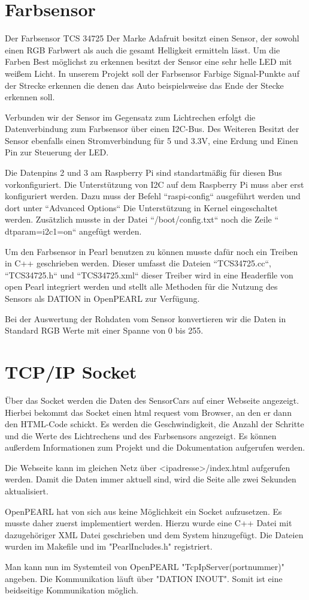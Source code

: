 \section{Farbsensor}
Der Farbsensor TCS 34725 Der Marke Adafruit besitzt einen Sensor, der sowohl einen RGB Farbwert als auch die gesamt Helligkeit ermitteln lässt. Um die Farben Best möglichst zu erkennen besitzt der Sensor eine sehr helle LED mit weißem Licht. In unserem Projekt soll der Farbsensor Farbige Signal-Punkte auf der Strecke erkennen die denen das Auto beispielsweise das Ende der Stecke erkennen soll. 

Verbunden wir der Sensor im Gegensatz zum Lichtrechen erfolgt die Datenverbindung zum Farbsensor über einen I2C-Bus. Des Weiteren Besitzt der Sensor ebenfalls einen Stromverbindung für 5 und 3.3V, eine Erdung und Einen Pin zur Steuerung der LED.

Die Datenpins 2 und 3 am Raspberry Pi sind standartmäßig für diesen Bus vorkonfiguriert. Die Unterstützung von I2C auf dem Raspberry Pi muss aber erst konfiguriert werden. Dazu muss der Befehl “raspi-config“ ausgeführt werden und dort unter “Advanced Options“ Die Unterstützung in Kernel eingeschaltet werden. Zusätzlich musste in der Datei “/boot/config.txt“ noch die Zeile “ dtparam=i2c1=on“ angefügt werden.

Um den Farbsensor in Pearl benutzen zu können musste dafür noch ein Treiben in C++ geschrieben werden. Dieser umfasst die Dateien “TCS34725.cc“, “TCS34725.h“ und “TCS34725.xml“ dieser Treiber wird in eine Headerfile von open Pearl integriert werden und stellt alle Methoden für die Nutzung des Sensors als DATION in OpenPEARL zur Verfügung.

Bei der Auswertung der Rohdaten vom Sensor konvertieren wir die Daten in Standard RGB Werte mit einer Spanne von 0 bis 255.

\section{TCP/IP Socket}
Über das Socket werden die Daten des SensorCars auf einer Webseite angezeigt. Hierbei bekommt das Socket einen html request vom Browser, an den er dann den HTML-Code schickt. Es werden die Geschwindigkeit, die Anzahl der Schritte und die Werte des Lichtrechens und des Farbsensors angezeigt. Es können außerdem Informationen zum Projekt und die Dokumentation aufgerufen werden. 

Die Webseite kann im gleichen Netz über <ipadresse>/index.html aufgerufen werden. Damit die Daten immer aktuell sind, wird die Seite alle zwei Sekunden aktualisiert.

OpenPEARL hat von sich aus keine Möglichkeit ein Socket aufzusetzen. Es musste daher zuerst implementiert werden. Hierzu wurde eine C++ Datei mit dazugehöriger XML Datei geschrieben und dem System hinzugefügt. Die Dateien wurden im Makefile und im "PearlIncludes.h" registriert. 

Man kann nun im Systemteil von OpenPEARL "TcpIpServer(portnummer)" angeben. Die Kommunikation läuft über "DATION INOUT". Somit ist eine beidseitige Kommunikation möglich. 
